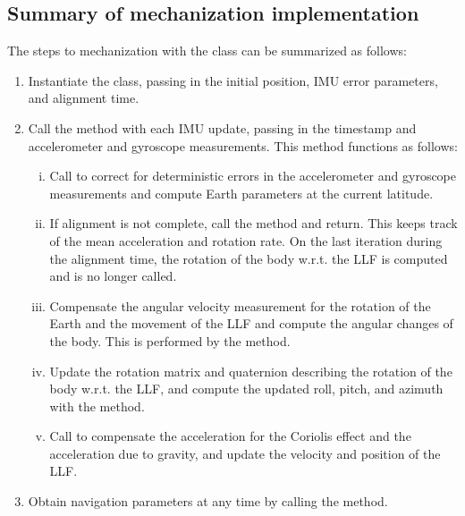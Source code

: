 \documentclass[11pt, oneside]{article}   	%
\begin{document}
\subsection{Summary of mechanization implementation}
The steps to mechanization with the  class can be summarized as follows:
\begin{enumerate}
	\item Instantiate the  class, passing in the initial position, IMU error parameters, and alignment time.
	\item Call the  method with each IMU update, passing in the timestamp and accelerometer and gyroscope measurements.  This method functions as follows:
	\begin{enumerate}[i.]
		\item Call  to correct for deterministic errors in the accelerometer and gyroscope measurements and compute Earth parameters at the current latitude.
		\item If alignment is not complete, call the  method and return. This keeps track of the mean acceleration and rotation rate. On the last iteration during the alignment time, the rotation of the body w.r.t. the LLF is computed and  is no longer called.
		\item Compensate the angular velocity measurement for the rotation of the Earth and the movement of the LLF and compute the angular changes of the body.  This is performed by the  method.
		\item Update the rotation matrix and quaternion describing the rotation of the body w.r.t. the LLF, and compute the updated roll, pitch, and azimuth with the  method.
		\item Call  to compensate the acceleration for the Coriolis effect and the acceleration due to gravity, and update the velocity and position of the LLF.
	\end{enumerate}
	\item Obtain navigation parameters at any time by calling the  method.
\end{enumerate}
\end{document}
